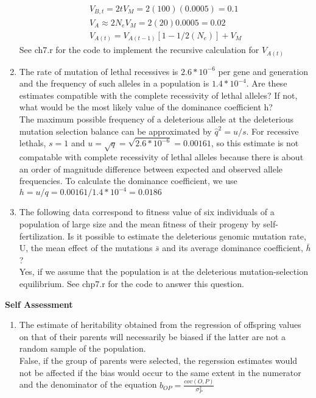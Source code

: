 \documentclass[12pt]{amsart}
\begin{document}
\begin{enumerate}
\begin{gather*}
V_{B,t} = 2tV_M = 2(100)(0.0005)=0.1\\
V_A\approx 2N_eV_M=2(20)0.0005=0.02\\
V_{A(t)} = V_{A(t-1)}[1-1/2(N_e)] + V_M
\end{gather*}
See ch7.r for the code to implement the recursive calculation for $V_{A(t)}$
\item The rate of mutation of lethal recessives is $2.6*10^{-6}$ per gene and generation and the frequency of such alleles in a population is $1.4*10^{-4}$. Are these estimates compatible with the complete recessivity of lethal alleles? If not, what would be the most likely value of the dominance coefficient h?\\
The maximum possible frequency of a deleterious allele at the deleterious mutation selection balance can be approximated by $\hat{q}^2 = u/s$. For recessive lethals, $s = 1$ and $u = \sqrt{q} = \sqrt{2.6*10^{-6}} = 0.00161$, so this estimate is not compatable with complete recessivity of lethal alleles because there is about an order of magnitude difference between expected and observed allele frequencies. To calculate the dominance coefficient, we use $h=u/q	= 0.00161/1.4*10^{-4} = 0.0186$
\item The following data correspond to fitness value of six individuals of a population of large size and the mean fitness of their progeny by self-fertilization. Is it possible to estimate the deleterious genomic mutation rate, U, the mean effect of the mutations $\bar{s}$ and its average dominance coefficient, $\bar{h}$? \\
Yes, if we assume that the population is at the deleterious mutation-selection equilibrium. See chp7.r for the code to answer this question.
\end{enumerate}

{\large \bf Self Assessment}
\begin{enumerate}
\item The estimate of heritability obtained from the regression of offspring values on that of their parents will necessarily be biased if the latter are not a random sample of the population.\\
False, if the group of parents were selected, the regerssion estimates would not be affected if the bias would occur to the same extent in the numerator and the denominator of the equation $b_{OP} = \frac{cov(O,P)}{\sigma^2_P}$\\
\end{enumerate}


\medskip
\end{document}
